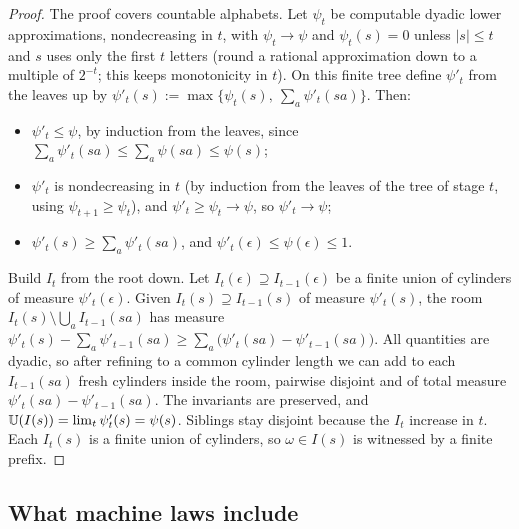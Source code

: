 \begin{proof}
The proof covers countable alphabets. Let $\psi_t$ be computable dyadic lower approximations, nondecreasing in $t$, with $\psi_t\to\psi$ and $\psi_t(s)=0$ unless $|s|\le t$ and $s$ uses only the first $t$ letters (round a rational approximation down to a multiple of $2^{-t}$; this keeps monotonicity in $t$). On this finite tree define $\psi'_t$ from the leaves up by $\psi'_t(s):=\max\{\psi_t(s),\ \sum_a\psi'_t(sa)\}$. Then:
\begin{itemize}
\item $\psi'_t\le\psi$, by induction from the leaves, since $\sum_a\psi'_t(sa)\le\sum_a\psi(sa)\le\psi(s)$;
\item $\psi'_t$ is nondecreasing in $t$ (by induction from the leaves of the tree of stage $t$, using $\psi_{t+1}\ge\psi_t$), and $\psi'_t\ge\psi_t\to\psi$, so $\psi'_t\to\psi$;
\item $\psi'_t(s)\ge\sum_a\psi'_t(sa)$, and $\psi'_t(\epsilon)\le\psi(\epsilon)\le1$.
\end{itemize}
Build $I_t$ from the root down. Let $I_t(\epsilon)\supseteq I_{t-1}(\epsilon)$ be a finite union of cylinders of measure $\psi'_t(\epsilon)$. Given $I_t(s)\supseteq I_{t-1}(s)$ of measure $\psi'_t(s)$, the room $I_t(s)\setminus\bigcup_aI_{t-1}(sa)$ has measure $\psi'_t(s)-\sum_a\psi'_{t-1}(sa)\ge\sum_a\big(\psi'_t(sa)-\psi'_{t-1}(sa)\big)$. All quantities are dyadic, so after refining to a common cylinder length we can add to each $I_{t-1}(sa)$ fresh cylinders inside the room, pairwise disjoint and of total measure $\psi'_t(sa)-\psi'_{t-1}(sa)$. The invariants are preserved, and $\mathbb{U}(I(s))=\lim_t\psi'_t(s)=\psi(s)$. Siblings stay disjoint because the $I_t$ increase in $t$. Each $I_t(s)$ is a finite union of cylinders, so $\omega\in I(s)$ is witnessed by a finite prefix.
\end{proof}

\subsection{What machine laws include}\label{app:setting:includes}

